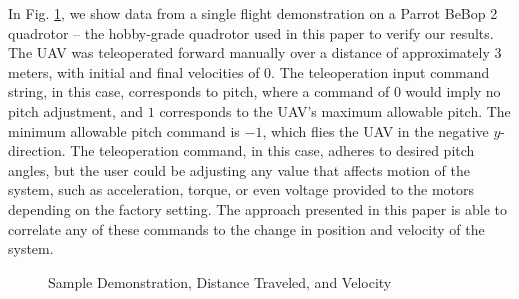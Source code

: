 \documentclass[letterpaper, 10 pt, conference]{ieeeconf}  %
\newcommand\NB[1]{$\spadesuit$\footnote{NB: #1}}
\begin{document}
In Fig. \ref{fig:samps}, we show data from a single flight demonstration on a Parrot BeBop 2 quadrotor -- the hobby-grade quadrotor used in this paper to verify our results. The UAV was teleoperated forward manually over a distance of approximately $3$ meters, with initial and final velocities of $0$. The teleoperation input command string, in this case, corresponds to pitch, where a command of $0$ would imply no pitch adjustment, and $1$ corresponds to the UAV's maximum allowable pitch. The minimum allowable pitch command is $-1$, which flies the UAV in the negative $y$-direction. The teleoperation command, in this case, adheres to desired pitch angles, but the user could be adjusting any value that affects motion of the system, such as acceleration, torque, or even voltage provided to the motors depending on the factory setting. The approach presented in this paper is able to correlate any of these commands to the change in position and velocity of the system.
\begin{figure}[ht]
	\centering
	\caption{Sample Demonstration, Distance Traveled, and Velocity}
	\label{fig:samps}
\end{figure}
\end{document}
